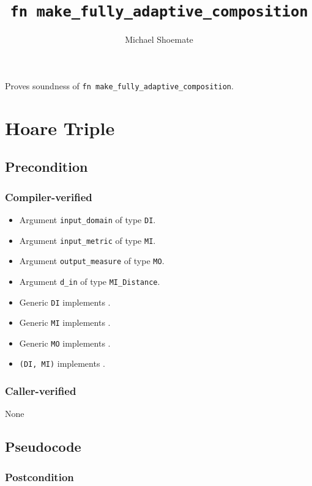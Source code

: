 \documentclass{article}
\title{\texttt{fn make\_fully\_adaptive\_composition}}
\author{Michael Shoemate}
\date{}
\begin{document}
\maketitle

\contrib
Proves soundness of \texttt{fn make\_fully\_adaptive\_composition}.

\section{Hoare Triple}
\subsection*{Precondition}
\subsubsection*{Compiler-verified}
\begin{itemize}
    \item Argument \texttt{input\_domain} of type \texttt{DI}.
    \item Argument \texttt{input\_metric} of type \texttt{MI}.
    \item Argument \texttt{output\_measure} of type \texttt{MO}.
    \item Argument \texttt{d\_in} of type \texttt{MI\_Distance}.
    \item Generic \texttt{DI} implements .
    \item Generic \texttt{MI} implements .
    \item Generic \texttt{MO} implements .
    \item \texttt{(DI, MI)} implements .
\end{itemize}

\subsubsection*{Caller-verified}
None

\subsection*{Pseudocode}


\subsubsection*{Postcondition}
\begin{theorem}
\end{theorem}
\end{document}
